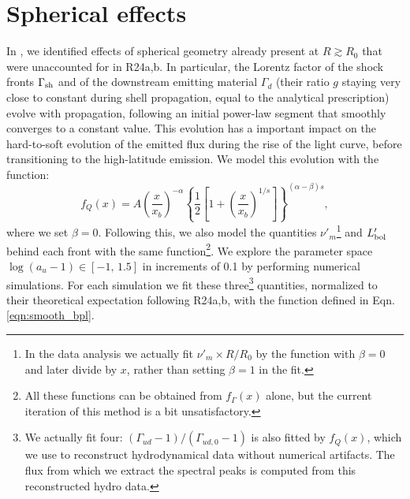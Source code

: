 \documentclass{article}
\newcommand{\sh}{{\rm sh}}
\newcommand{\bol}{{\rm bol}}
\begin{document}
\section{Spherical effects}\label{sec:spherical}
In \cite{charlet2025numerical}, we identified effects of spherical geometry already present at $R\gtrsim R_0$ that were unaccounted for in R24a,b. In particular, the Lorentz factor of the shock fronts $\Gamma_\sh$ and of the downstream emitting material $\Gamma_d$ (their ratio $g$ staying very close to constant during shell propagation, equal to the analytical prescription) evolve with propagation, following an initial power-law segment that smoothly converges to a constant value. This evolution has a important impact on the hard-to-soft evolution of the emitted flux during the rise of the light curve, before transitioning to the high-latitude emission. We model this evolution with the function:
\begin{equation}
    f_Q(x) = A \left(\frac{x}{x_b}\right)^{-\alpha}\left\{\frac{1}{2}\left[1+\left(\frac{x}{x_b}\right)^{1/s}\right]\right\}^{(\alpha-\beta)s},\label{eqn:smooth_bpl}
\end{equation}
where we set $\beta=0$. Following this, we also model the quantities $\nu'_m$\footnote{In the data analysis we actually fit $\nu'_m\times R/R_0$ by the function with $\beta=0$ and later divide by $x$, rather than setting $\beta=1$ in the fit.} and $L'_\bol$ behind each front with the same function\footnote{All these functions can be obtained from $f_\Gamma(x)$ alone, but the current iteration of this method is a bit unsatisfactory.}. We explore the parameter space $\log(a_u-1)\in[-1,\,1.5]$ in increments of 0.1 by performing numerical simulations. For each simulation we fit these three\footnote{We actually fit four: $(\Gamma_{ud}-1)/(\Gamma_{ud,0}-1)$ is also fitted by $f_Q(x)$, which we use to reconstruct hydrodynamical data without numerical artifacts. The flux from which we extract the spectral peaks is computed from this reconstructed hydro data.} quantities, normalized to their theoretical expectation following R24a,b, with the function defined in Eqn. \ref{eqn:smooth_bpl}.
\end{document}
